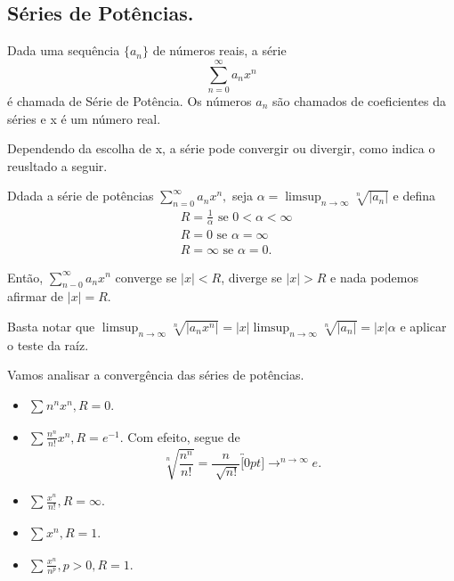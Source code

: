 \documentclass[analysis_notes.tex]{subfiles}
\begin{document}
\subsection{S\'eries de Pot\^encias.}
\begin{def*}
	Dada uma sequ\^encia $\{a_{n}\}$ de n\'umeros reais, a s\'erie
	$$
		\sum\limits_{n=0}^{\infty}a_{n}x^{n}
	$$
	\'e chamada de S\'erie de Pot\^encia. Os n\'umeros $a_{n}$ s\~ao chamados de coeficientes da s\'eries e x \'e um n\'umero real.
\end{def*}
Dependendo da escolha de x, a s\'erie pode convergir ou divergir, como indica o reusltado a seguir.
\begin{theorem*}
	Ddada a s\'erie de pot\^encias $\sum\limits_{n=0}^{\infty}a_{n}x^{n},$ seja $\alpha = \limsup_{n\to\infty}\sqrt[n]{|a_{n}|}$ e defina
	\begin{align*}
		 & R = \frac{1}{\alpha}\text{ se } 0 < \alpha < \infty \\
		 & R = 0 \text{ se } \alpha = \infty                   \\
		 & R = \infty \text{ se } \alpha = 0.
	\end{align*}
\end{theorem*}
Ent\~ao, $\sum\limits_{n-0}^{\infty}a_{n}x^{n}$ converge se $|x|<R$, diverge se $|x|>R$ e nada podemos afirmar de $|x|=R.$
\begin{proof*}
	Basta notar que $\limsup_{n\to\infty}\sqrt[n]{|a_{n}x^{n}|} = |x|\limsup_{n\to\infty}\sqrt[n]{|a_{n}|} = |x|\alpha$ e aplicar
	o teste da ra\'iz. \qedsymbol
\end{proof*}
Vamos analisar a converg\^encia das s\'eries de pot\^encias.
\begin{example}
	\begin{itemize}
		\item $\sum\limits_{}^{}n^{n}x^{n}, R = 0. $
		\item $\sum\limits_{}^{}\frac{n^{n}}{n!}x^{n}, R = e^{-1}.$ Com efeito, segue de
		      $$
			      \sqrt[n]{\frac{n^{n}}{n!}} = \frac{n}{\sqrt[]{n!}}\overbracket[0pt]{\longrightarrow}^{n\to \infty}e.
		      $$
		\item $\sum\limits_{}^{}\frac{x^{n}}{n!}, R = \infty.$
		\item $\sum\limits_{}^{}x^{n}, R=1.$
		\item $\sum\limits_{}^{}\frac{x^{n}}{n^{p}}, p > 0, R = 1.$
	\end{itemize}
\end{example}
\end{document}

